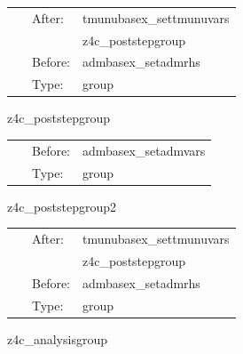 \hspace{5mm}

 \begin{tabular*}{160mm}{cll} 
~ & After:  & tmunubasex\_settmunuvars \\ 
~& ~ &z4c\_poststepgroup\\ 
~ & Before:  & admbasex\_setadmrhs \\ 
~ & Type:  & group \\ 
\end{tabular*} 


\vspace{5mm}


\hspace{5mm} z4c\_poststepgroup 

\hspace{5mm}{\it post-process z4c variables } 


\hspace{5mm}

 \begin{tabular*}{160mm}{cll} 
~ & Before:  & admbasex\_setadmvars \\ 
~ & Type:  & group \\ 
\end{tabular*} 


\vspace{5mm}


\hspace{5mm} z4c\_poststepgroup2 

\hspace{5mm}{\it post-process z4c variables, part 2 } 


\hspace{5mm}

 \begin{tabular*}{160mm}{cll} 
~ & After:  & tmunubasex\_settmunuvars \\ 
~& ~ &z4c\_poststepgroup\\ 
~ & Before:  & admbasex\_setadmrhs \\ 
~ & Type:  & group \\ 
\end{tabular*} 


\vspace{5mm}


\hspace{5mm} z4c\_analysisgroup 

